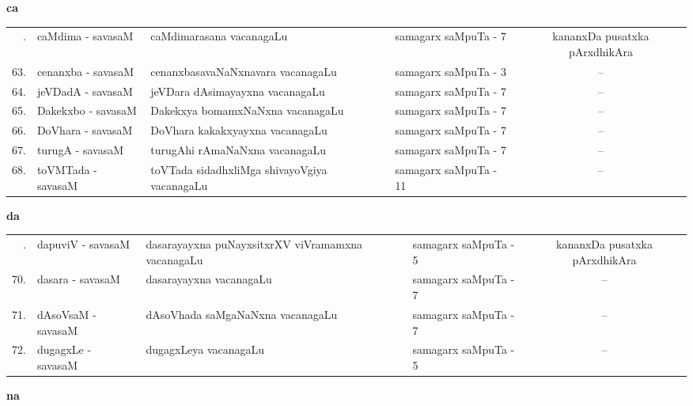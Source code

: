 \smallskip

\centerline{\bf ca}

{\renewcommand{\arraystretch}{1.35}
\begin{longtable}{rl>{\raggedright}p{5.5cm}lc}
\endfirsthead
\endhead
\endfoot
\endlastfoot
62. &   caMdima - savasaM &  caMdimarasana vacanagaLu & samagarx saMpuTa - 7  & kananxDa pusatxka pArxdhikAra\\
63. &   cenanxba - savasaM &  cenanxbasavaNaNxnavara vacanagaLu & samagarx saMpuTa - 3 & --\\
64. &   jeVDadA - savasaM &  jeVDara dAsimayayxna vacanagaLu & samagarx saMpuTa - 7 & --\\
65. &  Dakekxbo - savasaM &  Dakekxya bomamxNaNxna vacanagaLu & samagarx saMpuTa - 7 & --\\
66. & DoVhara - savasaM & DoVhara kakakxyayxna vacanagaLu & samagarx saMpuTa - 7 & --\\
67. &  turugA - savasaM &  turugAhi rAmaNaNxna vacanagaLu & samagarx saMpuTa - 7 & --\\
68. &  toVMTada - savasaM & toVTada sidadhxliMga shivayoVgiya\newline \phantom{AA} vacanagaLu & samagarx saMpuTa - 11 & --\\
\end{longtable}}

\smallskip

\centerline{\bf da}

{\renewcommand{\arraystretch}{1.35}
\begin{longtable}{rl>{\raggedright}p{5.5cm}lc}
\endfirsthead
\endhead
\endfoot
\endlastfoot
69. &  dapuviV - savasaM & dasarayayxna puNayxsitxrXV viVramamxna\newline \phantom{AA} vacanagaLu & samagarx saMpuTa - 5 & kananxDa pusatxka pArxdhikAra\\
70. &  dasara - savasaM &  dasarayayxna vacanagaLu & samagarx saMpuTa - 7 & --\\
71. &  dAsoVsaM - savasaM & dAsoVhada saMgaNaNxna vacanagaLu & samagarx saMpuTa - 7 & --\\
72. &  dugagxLe - savasaM & dugagxLeya vacanagaLu & samagarx saMpuTa - 5 & --\\
\end{longtable}}

\smallskip

\centerline{\bf na}

